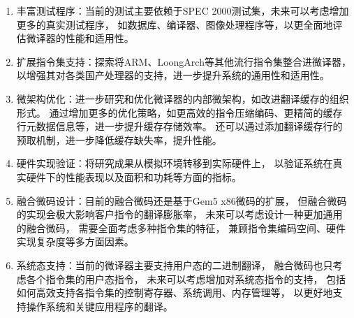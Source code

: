 \begin{enumerate}

\item 丰富测试程序：当前的测试主要依赖于SPEC 2000测试集，未来可以考虑增加更多的真实测试程序，
如数据库、编译器、图像处理程序等，以更全面地评估微译器的性能和适用性。

\item 扩展指令集支持：探索将ARM、LoongArch等其他流行指令集整合进微译器，
以增强其对各类国产处理器的支持，进一步提升系统的通用性和适用性。

\item 微架构优化：进一步研究和优化微译器的内部微架构，如改进翻译缓存的组织形式。
通过增加更多的优化策略，如更高效的指令压缩编码、更精简的缓存行元数据信息等，进一步提升缓存存储效率。
还可以通过添加翻译缓存行的预取机制，进一步降低缓存缺失率，提升性能。

\item 硬件实现验证：将研究成果从模拟环境转移到实际硬件上，
以验证系统在真实硬件下的性能表现以及面积和功耗等方面的指标。

\item 融合微码设计：目前的融合微码还是基于Gem5 x86微码的扩展，
但融合微码的实现会极大影响客户指令的翻译膨胀率，
未来可以考虑设计一种更加通用的融合微码， 需要全面考虑多种指令集的特征，
兼顾指令集编码空间、硬件实现复杂度等多方面因素。

\item 系统态支持：当前的微译器主要支持用户态的二进制翻译，
融合微码也只考虑各个指令集的用户态指令，
未来可以考虑增加对系统态指令的支持，
包括如何高效支持各指令集的控制寄存器、系统调用、内存管理等，
以更好地支持操作系统和关键应用程序的翻译。

\end{enumerate}



